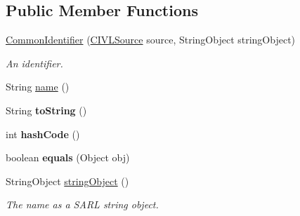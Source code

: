 \subsection*{Public Member Functions}
\begin{DoxyCompactItemize}
\item 
\hyperlink{classedu_1_1udel_1_1cis_1_1vsl_1_1civl_1_1model_1_1common_1_1CommonIdentifier_a734b88655ebd93f88ea6f18fc304d1f6}{Common\+Identifier} (\hyperlink{interfaceedu_1_1udel_1_1cis_1_1vsl_1_1civl_1_1model_1_1IF_1_1CIVLSource}{C\+I\+V\+L\+Source} source, String\+Object string\+Object)
\begin{DoxyCompactList}\small\item\em An identifier. \end{DoxyCompactList}\item 
String \hyperlink{classedu_1_1udel_1_1cis_1_1vsl_1_1civl_1_1model_1_1common_1_1CommonIdentifier_ad4c46eb2c2e369534c78fa3d3c38c3ad}{name} ()
\item 
\hypertarget{classedu_1_1udel_1_1cis_1_1vsl_1_1civl_1_1model_1_1common_1_1CommonIdentifier_a9e2427f2a804b138af673f3817ab700e}{}String {\bfseries to\+String} ()\label{classedu_1_1udel_1_1cis_1_1vsl_1_1civl_1_1model_1_1common_1_1CommonIdentifier_a9e2427f2a804b138af673f3817ab700e}

\item 
\hypertarget{classedu_1_1udel_1_1cis_1_1vsl_1_1civl_1_1model_1_1common_1_1CommonIdentifier_a4dd7b7668a7855bcfc75675b7ad4e662}{}int {\bfseries hash\+Code} ()\label{classedu_1_1udel_1_1cis_1_1vsl_1_1civl_1_1model_1_1common_1_1CommonIdentifier_a4dd7b7668a7855bcfc75675b7ad4e662}

\item 
\hypertarget{classedu_1_1udel_1_1cis_1_1vsl_1_1civl_1_1model_1_1common_1_1CommonIdentifier_a4950921a0235d1957337ed529f05a3d0}{}boolean {\bfseries equals} (Object obj)\label{classedu_1_1udel_1_1cis_1_1vsl_1_1civl_1_1model_1_1common_1_1CommonIdentifier_a4950921a0235d1957337ed529f05a3d0}

\item 
String\+Object \hyperlink{classedu_1_1udel_1_1cis_1_1vsl_1_1civl_1_1model_1_1common_1_1CommonIdentifier_a6e45251d1c05af619aef26a545878f84}{string\+Object} ()
\begin{DoxyCompactList}\small\item\em The name as a S\+A\+R\+L string object. \end{DoxyCompactList}\end{DoxyCompactItemize}


